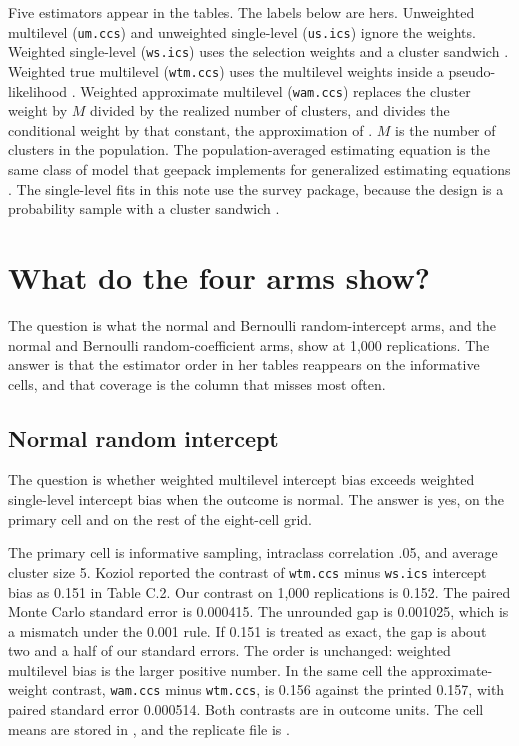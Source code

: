 Five estimators appear in the tables.
The labels below are hers.
Unweighted multilevel (\texttt{um.ccs}) and unweighted single-level
(\texttt{us.ics}) ignore the weights.
Weighted single-level (\texttt{ws.ics}) uses the selection weights and a
cluster sandwich \citep{binder1983,lumley2004}.
Weighted true multilevel (\texttt{wtm.ccs}) uses the multilevel weights inside
a pseudo-likelihood \citep{pfeffermann1998,asparouhov2006,rabehesketh2006}.
Weighted approximate multilevel (\texttt{wam.ccs}) replaces the cluster weight
by $M$ divided by the realized number of clusters, and divides the conditional
weight by that constant, the approximation of \citet{kovacevic2003}.
$M$ is the number of clusters in the population.
The population-averaged estimating equation is the same class of model that
geepack implements for generalized estimating equations
\citep{hojsgaard2006}.
The single-level fits in this note use the survey package, because the
design is a probability sample with a cluster sandwich
\citep{lumley2024}.

\section{What do the four arms show?}

The question is what the normal and Bernoulli random-intercept arms, and the
normal and Bernoulli random-coefficient arms, show at 1,000 replications.
The answer is that the estimator order in her tables reappears on the
informative cells, and that coverage is the column that misses most often.

\subsection{Normal random intercept}

The question is whether weighted multilevel intercept bias exceeds weighted
single-level intercept bias when the outcome is normal.
The answer is yes, on the primary cell and on the rest of the eight-cell grid.

The primary cell is informative sampling, intraclass correlation .05, and
average cluster size 5.
Koziol reported the contrast of \texttt{wtm.ccs} minus \texttt{ws.ics}
intercept bias as 0.151 in Table C.2.
Our contrast on 1,000 replications is 0.152.
The paired Monte Carlo standard error is 0.000415.
The unrounded gap is 0.001025, which is a mismatch under the 0.001 rule.
If 0.151 is treated as exact, the gap is about two and a half of our
standard errors.
The order is unchanged: weighted multilevel bias is the larger positive number.
In the same cell the approximate-weight contrast, \texttt{wam.ccs} minus
\texttt{wtm.ccs}, is 0.156 against the printed 0.157, with paired standard
error 0.000514.
Both contrasts are in outcome units.
The cell means are stored in , and the
replicate file is .

